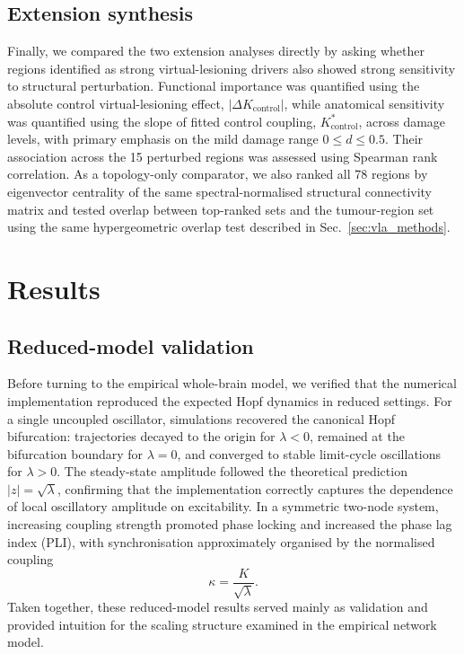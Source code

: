\documentclass[11pt, reprint, aps, prl, floatfix, secnumarabic]{revtex4-2}
\begin{document}
\subsection{Extension synthesis}
Finally, we compared the two extension analyses directly by asking whether regions identified as strong virtual-lesioning drivers also showed strong sensitivity to structural perturbation. Functional importance was quantified using the absolute control virtual-lesioning effect, \(|\Delta K_{\mathrm{control}}|\), while anatomical sensitivity was quantified using the slope of fitted control coupling, \(K^*_{\mathrm{control}}\), across damage levels, with primary emphasis on the mild damage range \(0 \leq d \leq 0.5\). Their association across the 15 perturbed regions was assessed using Spearman rank correlation. As a topology-only comparator, we also ranked all 78 regions by eigenvector centrality of the same spectral-normalised structural connectivity matrix and tested overlap between top-ranked sets and the tumour-region set using the same hypergeometric overlap test described in Sec.~\ref{sec:vla_methods}.

\section{Results}

\subsection{Reduced-model validation}\label{sec:reduced_validation}
Before turning to the empirical whole-brain model, we verified that the numerical implementation reproduced the expected Hopf dynamics in reduced settings. For a single uncoupled oscillator, simulations recovered the canonical Hopf bifurcation: trajectories decayed to the origin for $\lambda<0$, remained at the bifurcation boundary for $\lambda=0$, and converged to stable limit-cycle oscillations for $\lambda>0$. The steady-state amplitude followed the theoretical prediction $|z|=\sqrt{\lambda}$, confirming that the implementation correctly captures the dependence of local oscillatory amplitude on excitability. In a symmetric two-node system, increasing coupling strength promoted phase locking and increased the phase lag index (PLI), with synchronisation approximately organised by the normalised coupling
\begin{equation}
\kappa = \frac{K}{\sqrt{\lambda}}.
\end{equation}
Taken together, these reduced-model results served mainly as validation and provided intuition for the scaling structure examined in the empirical network model.
\end{document}

